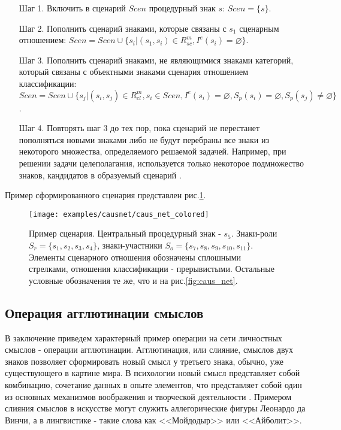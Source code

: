\documentclass[12pt]{scrartcl}
\begin{document}
	\begin{itemize}
		\item[Шаг 1.] Включить в сценарий $Scen$ процедурный знак $s$: $Scen=\{s\}$.
		\item[Шаг 2.] Пополнить сценарий знаками, которые связаны с $s_1$ сценарным отношением: $Scen=Scen\cup\{s_i|(s_1,s_i)\in R_{sc}^m, I^e(s_i)=\varnothing\}$.
		\item[Шаг 3.] Пополнить сценарий знаками, не являющимися знаками категорий, который связаны с объектными знаками сценария отношением классификации: $Scen=Scen\cup\{s_j|(s_i,s_j)\in R_{cl}^m, s_i\in Scen, I^e(s_i)=\varnothing, S_p(s_i)=\varnothing, S_p(s_j)\not=\varnothing\}$.
		\item[Шаг 4.] Повторять шаг 3 до тех пор, пока сценарий не перестанет пополняться новыми знаками либо не будут перебраны все знаки из некоторого множества, определяемого решаемой задачей. Например, при решении задачи целеполагания, используется только некоторое подмножество знаков, кандидатов в образуемый сценарий \cite{Osipov2014c}.
	\end{itemize}
	
	Пример сформированного сценария представлен рис.\ref{fig:scenarion}.
	
	\begin{figure}
		\centering
		\texttt{[image: examples/causnet/caus\_net\_colored]}
		\caption{Пример сценария. Центральный процедурный знак - $s_5$. Знаки-роли $S_r=\{s_1,s_2,s_3,s_4\}$, знаки-участники $S_o=\{s_7,s_8,s_9,s_{10},s_{11}\}$. Элементы сценарного отношения обозначены сплошными стрелками, отношения классификации - прерывистыми. Остальные условные обозначения те же, что и на рис.\ref{fig:caus_net}.}
		\label{fig:scenarion}		
	\end{figure}

		
	\subsection{Операция агглютинации смыслов}
	
	В заключение приведем характерный пример операции на сети личностных смыслов - операции агглютинации. Агглютинация, или слияние, смыслов двух знаков позволяет сформировать новый смысл у третьего знака, обычно, уже существующего в картине мира. В психологии новый смысл представляет собой комбинацию, сочетание данных в опыте элементов, что представляет собой один из основных механизмов воображения и творческой деятельности \cite{Asmolov1990,Rubinshtain2000}. Примером слияния смыслов в искусстве могут служить аллегорические фигуры Леонардо да Винчи, а в лингвистике - такие слова как <<Мойдодыр>> или <<Айболит>>.
	
\end{document}
